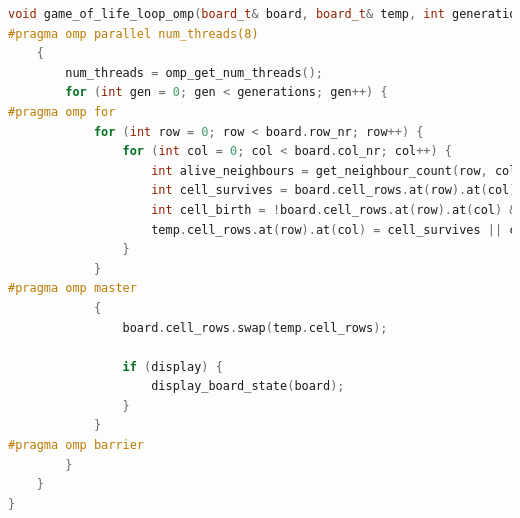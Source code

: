 \documentclass[a4paper,english,12pt,twoside=false]{scrartcl} %
\begin{document}
\begin{lstlisting}[caption={Parallel Naive State Generation Algorithm},label={lst:gol-parallel-naive-generation-algorithm},language=C++]
void game_of_life_loop_omp(board_t& board, board_t& temp, int generations, int display) {
#pragma omp parallel num_threads(8)
    {
        num_threads = omp_get_num_threads();
        for (int gen = 0; gen < generations; gen++) {
#pragma omp for
            for (int row = 0; row < board.row_nr; row++) {
                for (int col = 0; col < board.col_nr; col++) {
                    int alive_neighbours = get_neighbour_count(row, col, board);
                    int cell_survives = board.cell_rows.at(row).at(col) && (alive_neighbours == 2 || alive_neighbours == 3);
                    int cell_birth = !board.cell_rows.at(row).at(col) && (alive_neighbours == 3);
                    temp.cell_rows.at(row).at(col) = cell_survives || cell_birth;
                }
            }
#pragma omp master
            {
                board.cell_rows.swap(temp.cell_rows);

                if (display) {
                    display_board_state(board);
                }
            }
#pragma omp barrier
        }
    }
}
\end{lstlisting}
\end{document}
